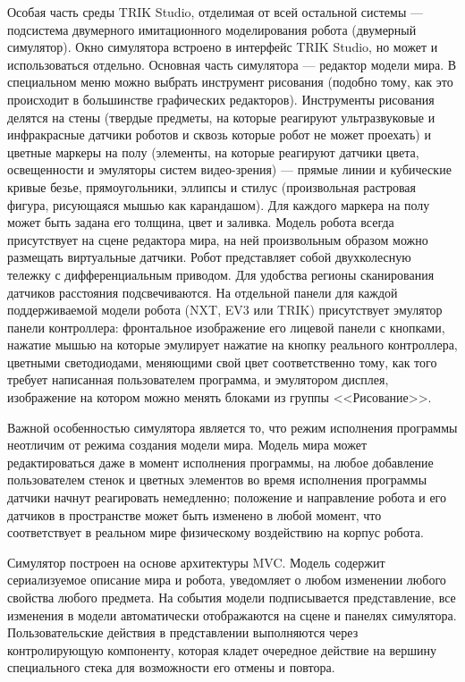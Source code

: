 \documentclass[a5paper]{article}
\begin{document}
Особая часть среды TRIK Studio, отделимая от всей остальной системы --- подсистема двумерного имитационного моделирования робота (двумерный симулятор). Окно симулятора встроено в интерфейс TRIK Studio, но может и использоваться отдельно. Основная часть симулятора --- редактор модели мира. В специальном меню можно выбрать инструмент рисования (подобно тому, как это происходит в большинстве графических редакторов). Инструменты рисования делятся на стены (твердые предметы, на которые реагируют ультразвуковые и инфракрасные датчики роботов и сквозь которые робот не может проехать) и цветные маркеры на полу (элементы, на которые реагируют датчики цвета, освещенности и эмуляторы систем видео-зрения) --- прямые линии и кубические кривые безье, прямоугольники, эллипсы и стилус (произвольная растровая фигура, рисующаяся мышью как карандашом). Для каждого маркера на полу может быть задана его толщина, цвет и заливка. Модель робота всегда присутствует на сцене редактора мира, на ней произвольным образом можно размещать виртуальные датчики. Робот представляет собой двухколесную тележку с дифференциальным приводом. Для удобства регионы сканирования датчиков расстояния подсвечиваются. На отдельной панели для каждой поддерживаемой модели робота (NXT, EV3 или TRIK) присутствует эмулятор панели контроллера: фронтальное изображение его лицевой панели с кнопками, нажатие мышью на которые эмулирует нажатие на кнопку реального контроллера, цветными светодиодами, меняющими свой цвет соответственно тому, как того требует написанная пользователем программа, и эмулятором дисплея, изображение на котором можно менять блоками из группы <<Рисование>>.

Важной особенностью симулятора является то, что режим исполнения программы неотличим от режима создания модели мира. Модель мира может редактироваться даже в момент исполнения программы, на любое добавление пользователем стенок и цветных элементов во время исполнения программы датчики начнут реагировать немедленно; положение и направление робота и его датчиков в пространстве может быть изменено в любой момент, что соответствует в реальном мире физическому воздействию на корпус робота.

Симулятор построен на основе архитектуры MVC. Модель содержит сериализуемое описание мира и робота, уведомляет о любом изменении любого свойства любого предмета. На события модели подписывается представление, все изменения в модели автоматически отображаются на сцене и панелях симулятора. Пользовательские действия в представлении выполняются через контролирующую компоненту, которая кладет очередное действие на вершину специального стека для возможности его отмены и повтора.
\end{document}
